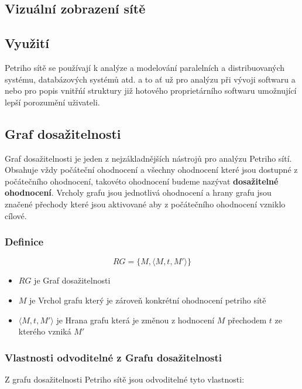 \documentclass[
  biblatex,
  glossaries,
  index
]{kidiplom}
\begin{document}


\subsection{Vizuální zobrazení sítě}


\subsection{Využití}

Petriho sítě se používají k analýze a modelování paralelních
a distribuovaných systému, databázových systémů atd. a to ať už
pro analýzu při vývoji softwaru a nebo pro popis vnitřńí struktury
již hotového proprietárního softwaru umožnující lepší porozumění uživateli.

\subsection{Graf dosažitelnosti}

Graf dosažitelnosti je jeden z nejzákladnějších nástrojů pro analýzu Petriho sítí.
Obsahuje vždy počáteční ohodnocení a všechny ohodnocení které jsou dostupné z počátečního ohodnocení, 
takovéto ohodnocení budeme nazývat \textbf{dosažitelné ohodnocení}. 
Vrcholy grafu jsou jednotlivá ohodnocení
a hrany grafu jsou značené přechody které jsou aktivované aby z počátečního ohodnocení vzniklo cílové.

\subsubsection{Definice}
$$RG = \{M, \langle M, t, M' \rangle\}$$
\begin{itemize}
  \item $RG$ je Graf dosažitelnosti
  \item $M$ je Vrchol grafu který je zároveň konkrétní ohodnocení petriho sítě
  \item $\langle M, t, M' \rangle$ je Hrana grafu která je změnou z hodnocení $M$ přechodem $t$ ze kterého vzniká $M'$
\end{itemize}

\subsubsection{Vlastnosti odvoditelné z Grafu dosažitelnosti}
Z grafu dosažitelnosti Petriho sítě jsou odvoditelné tyto vlastnosti:
\end{document}
